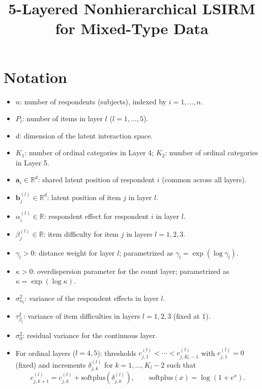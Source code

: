 \documentclass[A4paper,11pt]{article}
\begin{document}
\title{5-Layered Nonhierarchical LSIRM for Mixed-Type Data}
\maketitle

\section{Notation}

\begin{itemize}
  \item $n$: number of respondents (subjects), indexed by $i = 1,\dots,n$.
  \item $P_l$: number of items in layer $l$ ($l=1,\dots,5$).
  \item $d$: dimension of the latent interaction space.
  \item $K_1$: number of ordinal categories in Layer 4; $K_2$: number of ordinal categories in Layer 5.
  \item $\bm{a}_i \in \mathbb{R}^d$: shared latent position of respondent $i$ (common across all layers).
  \item $\bm{b}^{(l)}_j \in \mathbb{R}^d$: latent position of item $j$ in layer $l$.
  \item $\alpha^{(l)}_i \in \mathbb{R}$: respondent effect for respondent $i$ in layer $l$.
  \item $\beta^{(l)}_j \in \mathbb{R}$: item difficulty for item $j$ in layers $l=1,2,3$.
  \item $\gamma_l > 0$: distance weight for layer $l$; parametrized as $\gamma_l = \exp(\log\gamma_l)$.
  \item $\kappa > 0$: overdispersion parameter for the count layer; parametrized as $\kappa = \exp(\log\kappa)$.
  \item $\sigma^2_{\alpha_l}$: variance of the respondent effects in layer $l$.
  \item $\tau^2_{\beta_l}$: variance of item difficulties in layers $l=1,2,3$ (fixed at 1).
  \item $\sigma^2_0$: residual variance for the continuous layer.
  \item For ordinal layers ($l=4,5$): thresholds $c^{(l)}_{j,1} < \cdots < c^{(l)}_{j,K_l-1}$ with $c^{(l)}_{j,1} = 0$ (fixed) and increments $\delta^{(l)}_{j,k}$ for $k=1,\dots,K_l-2$ such that
  \[
    c^{(l)}_{j,k+1} = c^{(l)}_{j,k} + \mathrm{softplus}(\delta^{(l)}_{j,k}), \qquad \mathrm{softplus}(x) = \log(1+e^x).
  \]
\end{itemize}
\end{document}
